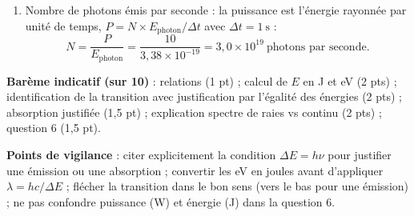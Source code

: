 \documentclass[11pt]{article}
\begin{document}
\begin{corrige}
\begin{enumerate}
\item Nombre de photons émis par seconde : la puissance est l'énergie rayonnée par unité de temps, $P = N\times E_{\text{photon}} / \Delta t$ avec $\Delta t = 1\ \mathrm{s}$ :
\[ N = \frac{P}{E_{\text{photon}}} = \frac{10}{3,38\times10^{-19}} = 3,0\times10^{19}\ \text{photons par seconde}. \]
\end{enumerate}
\textbf{Barème indicatif (sur 10)} : relations (1 pt) ; calcul de $E$ en J et eV (2 pts) ; identification de la transition avec justification par l'égalité des énergies (2 pts) ; absorption justifiée (1,5 pt) ; explication spectre de raies vs continu (2 pts) ; question 6 (1,5 pt).

\textbf{Points de vigilance} : citer explicitement la condition $\Delta E = h\nu$ pour justifier une émission ou une absorption ; convertir les eV en joules avant d'appliquer $\lambda = hc/\Delta E$ ; flécher la transition dans le bon sens (vers le bas pour une émission) ; ne pas confondre puissance (W) et énergie (J) dans la question 6.
\end{corrige}
\end{document}
